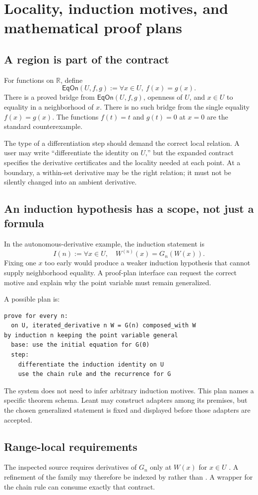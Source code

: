 \documentclass[11pt,a4paper]{article}
\newcommand{\code}[1]{\texttt{\detokenize{#1}}}
\newcommand{\R}{\mathbb R}
\newcommand{\EqOn}{\mathsf{EqOn}}
\theoremstyle{definition}
\begin{document}
\section{Locality, induction motives, and mathematical proof plans}\label{sec:locality}
\subsection{A region is part of the contract}
For functions on $\R$, define
\[
 \EqOn(U,f,g):=\forall x\in U,\ f(x)=g(x).
\]
There is a proved bridge from $\EqOn(U,f,g)$, openness of $U$, and $x\in U$
to equality in a neighborhood of $x$. There is no such bridge from the single
equality $f(x)=g(x)$. The functions $f(t)=t$ and $g(t)=0$ at $x=0$ are the
standard counterexample.

The type of a differentiation step should demand the correct local relation.
A user may write ``differentiate the identity on $U$,'' but the expanded
contract specifies the derivative certificates and the locality needed at each
point. At a boundary, a within-set derivative may be the right relation; it
must not be silently changed into an ambient derivative.

\subsection{An induction hypothesis has a scope, not just a formula}
In the autonomous-derivative example, the induction statement is
\[
 I(n):=\forall x\in U,\quad W^{(n)}(x)=G_n(W(x)).
\]
Fixing one $x$ too early would produce a weaker induction hypothesis that cannot
supply neighborhood equality. A proof-plan interface can request the correct
motive and explain why the point variable must remain generalized.

A possible plan is:
\begin{lstlisting}
prove for every n:
  on U, iterated_derivative n W = G(n) composed_with W
by induction n keeping the point variable general
  base: use the initial equation for G(0)
  step:
    differentiate the induction identity on U
    use the chain rule and the recurrence for G
\end{lstlisting}

The system does not need to infer arbitrary induction motives. This plan names
a specific theorem schema. Leant may construct adapters among its premises,
but the chosen generalized statement is fixed and displayed before those
adapters are accepted.

\subsection{Range-local requirements}
The inspected source requires derivatives of $G_n$ only at $W(x)$ for $x\in U$
\cite{autonomous}. A refinement of the family may therefore be indexed by
\code{along W(U)} rather than \code{everywhere}. A wrapper for the chain rule
can consume exactly that contract.
\end{document}

